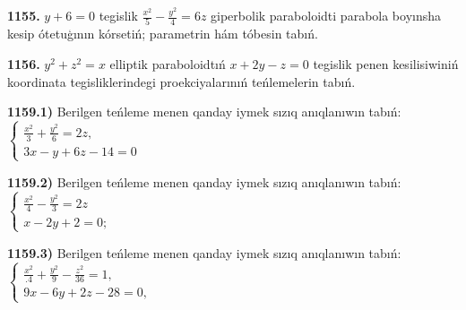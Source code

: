 \textbf{1155.} $y+6=0$ tegislik $\frac{x^2}{5}-\frac{y^2}{4}=6 z$ giperbolik paraboloidti parabola boyınsha kesip ótetuģının kórsetiń; parametrin hám tóbesin tabıń.

\textbf{1156.} $y^2+z^2=x$ elliptik paraboloidtıń $x+2 y-z=0$ tegislik penen kesilisiwiniń koordinata tegisliklerindegi proekciyalarınıń teńlemelerin tabıń.

\textbf{1159.1)} Berilgen teńleme menen qanday iymek sızıq anıqlanıwın tabıń: $\left\{\begin{array}{l}\frac{x^2}{3}+\frac{y^2}{6}=2 z, \\ 3 x-y+6 z-14=0\end{array}\right.$

\textbf{1159.2)} Berilgen teńleme menen qanday iymek sızıq anıqlanıwın tabıń: $\left\{\begin{array}{l}\frac{x^2}{4}-\frac{y^2}{3}=2 z \\ x-2 y+2=0 ;\end{array}\right.$

\textbf{1159.3)} Berilgen teńleme menen qanday iymek sızıq anıqlanıwın tabıń: $\left\{\begin{array}{l}\frac{x^2}{.4}+\frac{y^2}{9}-\frac{z^2}{36}=1, \\ 9 x-6 y+2 z-28=0,\end{array}\right.$
